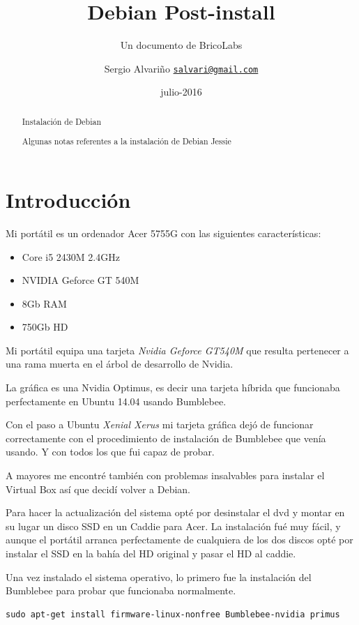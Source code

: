 \documentclass[12pt,spanish,]{scrartcl}
\title{Debian Post-install}
\subtitle{Un documento de BricoLabs}
\author{Sergio Alvariño
\href{mailto:salvari@gmail.com}{\nolinkurl{salvari@gmail.com}}}
\date{julio-2016}
\begin{document}
\maketitle
\begin{abstract}
Instalación de Debian

Algunas notas referentes a la instalación de Debian Jessie
\end{abstract}

{
\hypersetup{linkcolor=}
\setcounter{tocdepth}{3}
\tableofcontents
}
\hypertarget{introducciuxf3n}{%
\section{Introducción}\label{introducciuxf3n}}

Mi portátil es un ordenador Acer 5755G con las siguientes
características:

\begin{itemize}
\item
  Core i5 2430M 2.4GHz
\item
  NVIDIA Geforce GT 540M
\item
  8Gb RAM
\item
  750Gb HD
\end{itemize}

Mi portátil equipa una tarjeta \emph{Nvidia Geforce GT540M} que resulta
pertenecer a una rama muerta en el árbol de desarrollo de Nvidia.

La gráfica es una Nvidia Optimus, es decir una tarjeta híbrida que
funcionaba perfectamente en Ubuntu 14.04 usando Bumblebee.

Con el paso a Ubuntu \emph{Xenial Xerus} mi tarjeta gráfica dejó de
funcionar correctamente con el procedimiento de instalación de Bumblebee
que venía usando. Y con todos los que fui capaz de probar.

A mayores me encontré también con problemas insalvables para instalar el
Virtual Box así que decidí volver a Debian.

Para hacer la actualización del sistema opté por desinstalar el dvd y
montar en su lugar un disco SSD en un Caddie para Acer. La instalación
fué muy fácil, y aunque el portátil arranca perfectamente de cualquiera
de los dos discos opté por instalar el SSD en la bahía del HD original y
pasar el HD al caddie.

Una vez instalado el sistema operativo, lo primero fue la instalación
del Bumblebee para probar que funcionaba normalmente.

\begin{verbatim}
sudo apt-get install firmware-linux-nonfree Bumblebee-nvidia primus
\end{verbatim}
\end{document}
